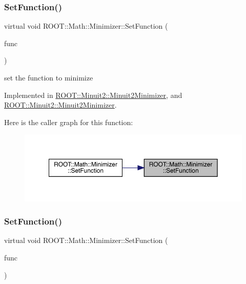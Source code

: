 \subsubsection{\texorpdfstring{SetFunction()}{SetFunction()}\hspace{0.1cm}{\footnotesize\ttfamily [1/4]}}
{\footnotesize\ttfamily virtual void R\+O\+O\+T\+::\+Math\+::\+Minimizer\+::\+Set\+Function (\begin{DoxyParamCaption}\item[{const \mbox{\hyperlink{namespaceROOT_1_1Math_aec22897f3d759f7c284893c81d980799}{R\+O\+O\+T\+::\+Math\+::\+I\+Multi\+Gen\+Function}} \&}]{func }\end{DoxyParamCaption})\hspace{0.3cm}{\ttfamily [pure virtual]}}



set the function to minimize 



Implemented in \mbox{\hyperlink{classROOT_1_1Minuit2_1_1Minuit2Minimizer_ae18efc66a943fe11b1114ff8c1b28ad0}{R\+O\+O\+T\+::\+Minuit2\+::\+Minuit2\+Minimizer}}, and \mbox{\hyperlink{classROOT_1_1Minuit2_1_1Minuit2Minimizer_ae18efc66a943fe11b1114ff8c1b28ad0}{R\+O\+O\+T\+::\+Minuit2\+::\+Minuit2\+Minimizer}}.

Here is the caller graph for this function\+:\nopagebreak
\begin{figure}[H]
\begin{center}
\leavevmode
\includegraphics[width=350pt]{dc/dc4/classROOT_1_1Math_1_1Minimizer_a4391c613ab0c3f9777e56b487ffa5eac_icgraph}
\end{center}
\end{figure}
\mbox{\label{classROOT_1_1Math_1_1Minimizer_a4391c613ab0c3f9777e56b487ffa5eac}} 
\subsubsection{\texorpdfstring{SetFunction()}{SetFunction()}\hspace{0.1cm}{\footnotesize\ttfamily [2/4]}}
{\footnotesize\ttfamily virtual void R\+O\+O\+T\+::\+Math\+::\+Minimizer\+::\+Set\+Function (\begin{DoxyParamCaption}\item[{const \mbox{\hyperlink{namespaceROOT_1_1Math_aec22897f3d759f7c284893c81d980799}{R\+O\+O\+T\+::\+Math\+::\+I\+Multi\+Gen\+Function}} \&}]{func }\end{DoxyParamCaption})\hspace{0.3cm}{\ttfamily [pure virtual]}}



